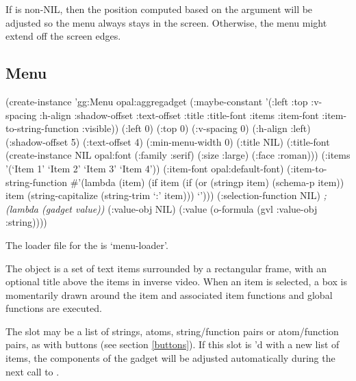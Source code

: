 If  is non-NIL, then the position computed
based on the  argument will be adjusted so the menu
always stays in the screen.  Otherwise, the menu might extend off the
screen edges.



\begin{group}
\section{Menu}
\label{menu}
\begin{programexample}
(create-instance 'gg:Menu opal:aggregadget
   (:maybe-constant '(:left :top :v-spacing :h-align :shadow-offset
		      :text-offset :title :title-font :items :item-font
		      :item-to-string-function :visible))
   (:left 0)
   (:top 0)
   (:v-spacing 0)
   (:h-align :left)
   (:shadow-offset 5)
   (:text-offset 4)
   (:min-menu-width 0)
   (:title NIL)
   (:title-font (create-instance NIL opal:font
                   (:family :serif)
		   (:size :large)
		   (:face :roman)))
   (:items '(`Item 1' `Item 2' `Item 3' `Item 4'))
   (:item-font opal:default-font)
   (:item-to-string-function \#'(lambda (item)
				 (if item
				     (if (or (stringp item) (schema-p item))
					 item
				       (string-capitalize (string-trim `:' item)))
				   `')))
   (:selection-function NIL)   {\it ; (lambda (gadget value))}
   (:value-obj NIL)
   (:value (o-formula (gvl :value-obj :string))))
\end{programexample}
\end{group}


\begin{center}
\end{center}

The loader file for the  is `menu-loader'.

The  object is a set of text items surrounded by a
rectangular frame, with an optional title above the items in inverse
video.  When an item is selected, a box is momentarily drawn around
the item and associated item functions and global functions are
executed.

The  slot may be a list of strings, atoms, string/function
pairs or atom/function pairs, as with buttons (see section
\ref{buttons}).  If this slot is 'd with a new list of items,
the components of the gadget will be adjusted automatically during the next
call to .

